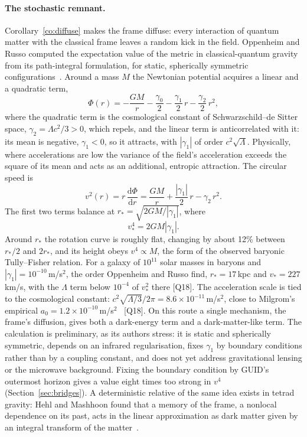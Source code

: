 \documentclass[11pt,a4paper]{article}
\theoremstyle{definition}
\theoremstyle{remark}
\newcommand{\chk}[1]{\textsf{[#1]}}
\newcommand{\dd}{\mathrm{d}}
\theoremstyle{definition}
\begin{document}
\paragraph{The stochastic remnant.} Corollary~\ref{co:diffuse} makes the frame diffuse: every interaction of quantum matter with the
classical frame leaves a random kick in the field. Oppenheim and Russo computed the expectation value of the metric in classical-quantum
gravity from its path-integral formulation, for static, spherically symmetric configurations~\cite{oppenheimrusso}. Around a mass $M$ the
Newtonian potential acquires a linear and a quadratic term,
\begin{equation}\label{eq:stochpot}
\Phi(r)=-\frac{GM}{r}-\frac{\gamma_0}{2}-\frac{\gamma_1}{2}\,r-\frac{\gamma_2}{2}\,r^2 ,
\end{equation}
where the quadratic term is the cosmological constant of Schwarzschild--de Sitter space, $\gamma_2=\Lambda c^2/3>0$, which repels, and
the linear term is anticorrelated with it: its mean is negative, $\gamma_1<0$, so it attracts, with $|\gamma_1|$ of order $c^2\sqrt\Lambda$.
Physically, where accelerations are low the variance of the field's acceleration exceeds the square of its mean and acts as an additional,
entropic attraction. The circular speed is
\begin{equation}\label{eq:vcirc}
v^2(r)=r\,\frac{\dd\Phi}{\dd r}=\frac{GM}{r}+\frac{|\gamma_1|}{2}\,r-\gamma_2\,r^2 .
\end{equation}
The first two terms balance at $r_*=\sqrt{2GM/|\gamma_1|}$, where
\begin{equation}\label{eq:btf}
v_*^4=2GM|\gamma_1| .
\end{equation}
Around $r_*$ the rotation curve is roughly flat, changing by about 12\% between $r_*/2$ and $2r_*$, and its height obeys $v^4\propto M$,
the form of the observed baryonic Tully--Fisher relation. For a galaxy of $10^{11}$ solar masses in baryons and $|\gamma_1|=10^{-10}$\,m/s$^2$,
the order Oppenheim and Russo find, $r_*=17$\,kpc and $v_*=227$\,km/s, with the $\Lambda$ term below $10^{-4}$ of $v_*^2$ there \chk{Q18}.
The acceleration scale is tied to the cosmological constant: $c^2\sqrt{\Lambda/3}/2\pi=8.6\times10^{-11}$\,m/s$^2$, close to Milgrom's
empirical $a_0=1.2\times10^{-10}$\,m/s$^2$~\cite{milgrom} \chk{Q18}. On this route a single mechanism, the frame's diffusion, gives both a
dark-energy term and a dark-matter-like term. The calculation is preliminary, as its authors stress: it is static and spherically
symmetric, depends on an infrared regularisation, fixes $\gamma_1$ by boundary conditions rather than by a coupling constant, and does not
yet address gravitational lensing or the microwave background. Fixing the boundary condition by GUID's outermost horizon gives a value
eight times too strong in $v^4$ (Section~\ref{sec:bridges}). A deterministic relative of the same idea exists in tetrad gravity: Hehl
and Mashhoon found that a memory of the frame, a nonlocal dependence on its past, acts in the linear approximation as dark matter given by
an integral transform of the matter~\cite{hehlmashhoon}.
\end{document}
